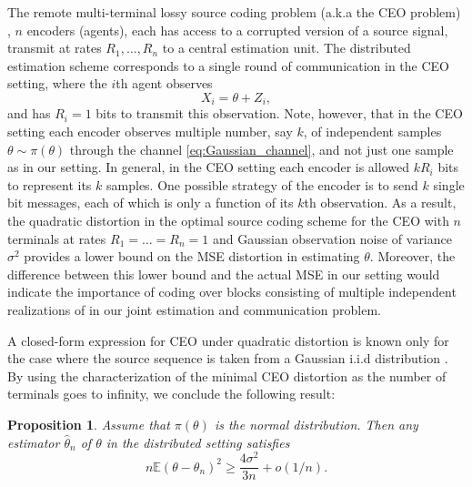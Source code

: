 \documentclass[letterpaper, conference]{IEEEtran}      %
\newtheorem{prop}[thm]{\bf {Proposition}}
\begin{document}
The remote multi-terminal lossy source coding problem (a.k.a the CEO problem) \cite{berger1996ceo}, $n$ encoders (agents), each has access to a corrupted version of a source signal, transmit at rates $R_1,\ldots,R_n$ to a central estimation unit. The distributed estimation scheme corresponds to a single round of communication in the CEO setting, where the $i$th agent observes 
\begin{equation}
\label{eq:Gaussian_channel}
X_i = \theta + Z_i,
\end{equation}
and has $R_i=1$ bits to transmit this observation. Note, however, that in the CEO setting each encoder observes multiple number, say $k$, of independent samples $\theta \sim \pi(\theta)$ through the channel \eqref{eq:Gaussian_channel}, and not just one sample as in our setting. In general, in the CEO setting each encoder is allowed $kR_i$ bits to represent its $k$ samples. One possible strategy of the encoder is to send $k$ single bit messages, each of which is only a function of its $k$th observation.  
As a result, the quadratic distortion in the optimal source coding scheme for the CEO with $n$ terminals at rates $R_1 = \ldots = R_n = 1$ and Gaussian observation noise of variance $\sigma^2$ provides a lower bound on the MSE distortion in estimating $\theta$. Moreover, the difference between this lower bound and the actual MSE in our setting would indicate the importance of coding over blocks consisting of multiple independent realizations of  in our joint estimation and communication problem. \par
A closed-form expression for CEO under quadratic distortion is known only for the case where the source sequence is taken from a Gaussian i.i.d distribution \cite{prabhakaran2004rate}. By using the characterization of the minimal CEO distortion as the number of terminals goes to infinity, we conclude the following result:
\begin{prop} \label{prop:ceo_lower_bound}
Assume that $\pi(\theta)$ is the normal distribution. Then any estimator $\widehat{\theta}_n$ of $\theta$ in the distributed setting satisfies
\[
 n\mathbb E \left( \theta - \theta_n \right)^2 \geq \frac{4\sigma^2}{3n} + o(1/n).
\]
\end{prop}
\end{document}
